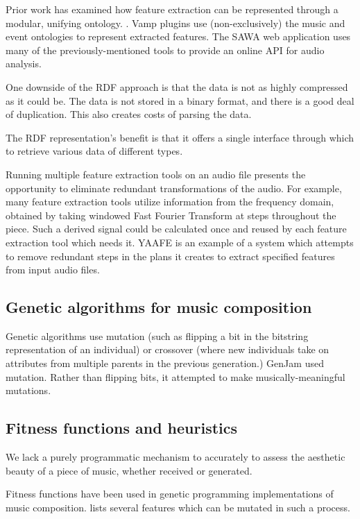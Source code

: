 \documentclass[11pt,conference,letterpaper]{IEEEtran}
\begin{document}
Prior work has examined how feature extraction can be represented through a modular, unifying ontology. \cite{raimond2008web}. Vamp plugins use (non-exclusively) the music \cite{raimond2007music} and event \cite{raimond2007event} ontologies to represent extracted features. The SAWA web application \cite{fazekas2009reusable} uses many of the previously-mentioned tools to provide an online API for audio analysis.

One downside of the RDF approach is that the data is not as highly compressed as it could be. The data is not stored in a binary format, and there is a good deal of duplication. This also creates costs of parsing the data.

The RDF representation's benefit is that it offers a single interface through which to retrieve various data of different types.

Running multiple feature extraction tools on an audio file presents the opportunity to eliminate redundant transformations of the audio. For example, many feature extraction tools utilize information from the frequency domain, obtained by taking windowed Fast Fourier Transform at steps throughout the piece. Such a derived signal could be calculated once and reused by each feature extraction tool which needs it. YAAFE \cite{mathieu2010yaafe} is an example of a system which attempts to remove redundant steps in the plans it creates to extract specified features from input audio files.

\subsection{Genetic algorithms for music composition}

Genetic algorithms use mutation (such as flipping a bit in the bitstring representation of an individual) or crossover (where new individuals take on attributes from multiple parents in the previous generation.) GenJam used mutation. Rather than flipping bits, it attempted to make musically-meaningful mutations.

\subsection{Fitness functions and heuristics}

We lack a purely programmatic mechanism to accurately to assess the aesthetic beauty of a piece of music, whether received or generated.

Fitness functions have been used in genetic programming implementations of music composition. \cite{towsey2001towards} lists several features which can be mutated in such a process.
\end{document}
